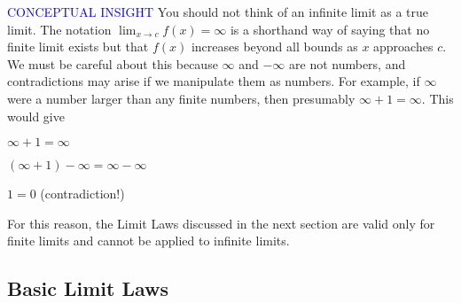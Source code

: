 \documentclass{article}
\begin{document}
\textcolor{blue}{CONCEPTUAL INSIGHT} You should not think of an infinite limit as a true limit. The notation $\lim_{x\to c}f(x) = \infty$ is a shorthand way of saying that no finite limit exists but that $f(x)$ increases beyond all bounds as $x$ approaches $c$. We must be careful about this because $\infty$ and $-\infty$ are not numbers, and contradictions may arise if we manipulate them as numbers. For example, if $\infty$ were a number larger than any finite numbers, then presumably $\infty + 1 = \infty$. This would give
\begin{center}$\infty + 1 = \infty$\end{center}
\begin{center}$(\infty + 1) - \infty = \infty - \infty$\end{center}
\begin{center}$1 = 0$ (contradiction!)\end{center}
For this reason, the Limit Laws discussed in the next section are valid only for finite limits and cannot be applied to infinite limits.



\subsection*{Basic Limit Laws}
\end{document}
